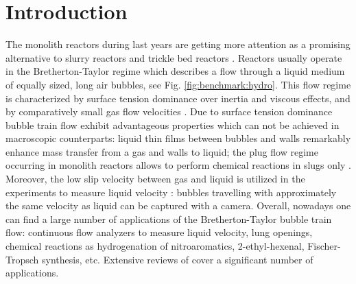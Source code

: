 \documentclass{article}
\begin{document}
\section{Introduction}
\label{intro}
The monolith reactors during last years are getting more attention as a promising alternative to slurry
reactors and trickle bed reactors \cite{kreutzer-overview,bercic-mass}. Reactors usually operate in the Bretherton-Taylor regime \cite{bretherton,taylor} which describes a flow through
a liquid medium of equally sized, long air bubbles, see
Fig. \ref{fig:benchmark:hydro}. This flow regime
is characterized by surface tension dominance over inertia and viscous effects, and by
comparatively small gas flow velocities \cite{yue-mass}. Due to surface tension dominance bubble train flow exhibit advantageous properties which can not be achieved
in macroscopic counterparts: liquid thin films \cite{bretherton} between bubbles and walls remarkably enhance mass
transfer from a gas and walls to liquid; the plug flow regime occurring in monolith reactors allows to perform chemical reactions in slugs only \cite{kreutzer-overview}. Moreover, the low slip velocity between gas and liquid is utilized in the experiments to measure liquid velocity \cite{taylor}:  bubbles travelling with approximately the same velocity as liquid can be captured with a camera. Overall, nowadays one can find a large number of applications
of the Bretherton-Taylor bubble train flow: continuous flow analyzers to measure liquid velocity, lung openings, chemical reactions
as hydrogenation of nitroaromatics, 2-ethyl-hexenal, Fischer-Tropsch synthesis, etc. Extensive reviews of \citet{kreutzer-overview,
gupta-review,yue-mass} cover a significant number of applications. 
\end{document}
